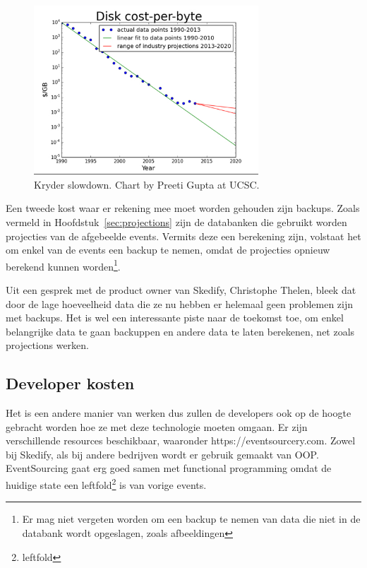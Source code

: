 \begin{figure}[h]
\caption{Kryder slowdown. Chart by Preeti Gupta at UCSC.}
\centering
\includegraphics[width=0.75\textwidth]{img/kryder-slowdown}
\end{figure}

Een tweede kost waar er rekening mee moet worden gehouden zijn backups. Zoals vermeld in Hoofdstuk~\ref{sec:projections} zijn de databanken die gebruikt worden projecties van de afgebeelde events. Vermits deze een berekening zijn, volstaat het om enkel van de events een backup te nemen, omdat de projecties opnieuw berekend kunnen worden\footnote{Er mag niet vergeten worden om een backup te nemen van data die niet in de databank wordt opgeslagen, zoals afbeeldingen}.

Uit een gesprek met de product owner van Skedify, Christophe Thelen, bleek dat door de lage hoeveelheid data die ze nu hebben er helemaal geen problemen zijn met backups. Het is wel een interessante piste naar de toekomst toe, om enkel belangrijke data te gaan backuppen en andere data te laten berekenen, net zoals projections werken.

\subsection{Developer kosten}
\label{subsec:developer-kosten}

Het is een andere manier van werken dus zullen de developers ook op de hoogte gebracht worden hoe ze met deze technologie moeten omgaan. Er zijn verschillende resources beschikbaar, waaronder https://eventsourcery.com. Zowel bij Skedify, als bij andere bedrijven wordt er gebruik gemaakt van \gls{OOP}. EventSourcing gaat erg goed samen met functional programming omdat de huidige state een \gls{leftfold}\footnote{\glsdesc{leftfold}} is van vorige events.

